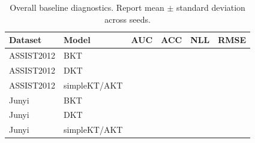 \begin{table}[t]
\centering
\caption{Overall baseline diagnostics. Report mean $\pm$ standard deviation across seeds.}
\label{tab:overall}
\footnotesize
\begin{tabular}{llrrrr}
\toprule
Dataset & Model & AUC & ACC & NLL & RMSE \\
\midrule
ASSIST2012 & BKT & \todo{} & \todo{} & \todo{} & \todo{} \\
ASSIST2012 & DKT & \todo{} & \todo{} & \todo{} & \todo{} \\
ASSIST2012 & simpleKT/AKT & \todo{} & \todo{} & \todo{} & \todo{} \\
Junyi & BKT & \todo{} & \todo{} & \todo{} & \todo{} \\
Junyi & DKT & \todo{} & \todo{} & \todo{} & \todo{} \\
Junyi & simpleKT/AKT & \todo{} & \todo{} & \todo{} & \todo{} \\
\bottomrule
\end{tabular}
\end{table}
